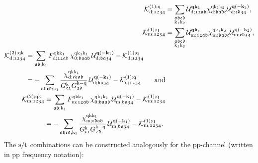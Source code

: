 \documentclass[\main/main.tex]{subfiles}
\begin{document}
\begin{subequations}\label{eq:kernel_functions_dens_magn}
\begin{align}
	\mathcal{K}^{(1);\text{q}}_{\text{d};\mathfrak{1234}}&=\sum_{\substack{\mathfrak{abcd}\\\text{k}_1\text{k}_2}} \mathcal{U}^{\textbf{q}\textbf{k}_1}_{\text{d};\mathfrak{12ab}} \chi^{\text{q}\text{k}_1\text{k}_2}_{\text{d};\mathfrak{badc}} \mathcal{U}^{\textbf{q}(-\textbf{k}_2)}_{\text{d};\mathfrak{cd34}},\\
	\mathcal{K}^{(1);\text{q}}_{\text{m};\mathfrak{1234}}&=\sum_{\substack{\mathfrak{abcd}\\\text{k}_1\text{k}_2}} \mathcal{U}^{\textbf{q}\textbf{k}_1}_{\text{m};\mathfrak{12ab}} \chi^{\text{q}\text{k}_1\text{k}_2}_{\text{m};\mathfrak{badc}} \mathcal{U}^{\textbf{q}(-\textbf{k}_2)}_{\text{m};\mathfrak{cd34}},\\
\begin{split}
	\mathcal{K}^{(2);\text{q}\text{k}}_{\text{d};\mathfrak{1234}}&=\sum_{\mathfrak{ab};\text{k}_1} F^{\text{q}\text{k}\text{k}_1}_{\text{d};\mathfrak{12ab}}\,\chi^{\text{q}\text{k}_1\text{k}_1}_{0;\mathfrak{baab}}\,\mathcal{U}^{\textbf{q}(-\textbf{k}_1)}_{\text{d};\mathfrak{ba34}}-\mathcal{K}^{(1);\text{q}}_{\text{d};\mathfrak{1234}}\\
	&=-\sum_{\mathfrak{abcd};\text{k}_1} \frac{\chi^{\text{q}\text{k}\text{k}_1}_{\text{d};\mathfrak{cdab}}}{G^{\text{k}}_{\mathfrak{c1}}G^{\text{k}-\text{q}}_{\mathfrak{2d}}}\,\mathcal{U}^{\textbf{q}(-\textbf{k}_1)}_{\text{d};\mathfrak{ba34}}-\mathcal{K}^{(1);\text{q}}_{\text{d};\mathfrak{1234}}\qquad\text{and}
\end{split}\\
\begin{split}
	\mathcal{K}^{(2);\text{q}\text{k}}_{\text{m};\mathfrak{1234}}&=\sum_{\mathfrak{ab};\text{k}_1} F^{\text{q}\text{k}\text{k}_1}_{\text{m};\mathfrak{12ab}}\,\chi^{\text{q}\text{k}_1\text{k}_1}_{0;\mathfrak{baab}}\,\mathcal{U}^{\textbf{q}(-\textbf{k}_1)}_{\text{m};\mathfrak{ba34}}-\mathcal{K}^{(1);\text{q}}_{\text{m};\mathfrak{1234}}\\
	&=-\sum_{\mathfrak{abcd};\text{k}_1} \frac{\chi^{\text{q}\text{k}\text{k}_1}_{\text{m};\mathfrak{cdab}}}{G^{\text{k}}_{\mathfrak{c1}}G^{\text{k}-\text{q}}_{\mathfrak{2d}}}\,\mathcal{U}^{\textbf{q}(-\textbf{k}_1)}_{\text{m};\mathfrak{ba34}}-\mathcal{K}^{(1);\text{q}}_{\text{m};\mathfrak{1234}}.
\end{split}
\end{align}
\end{subequations}
The $\text{s}/\text{t}$ combinations can be constructed analogously for the pp-channel (written in pp frequency notation):
\end{document}
